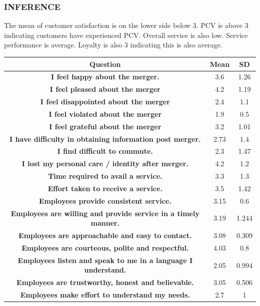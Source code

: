 \documentclass[a4paper, 12pt]{extarticle}
\begin{document}
{\subsubsection{INFERENCE}
The mean of customer satisfaction is on the lower side below 3.  PCV is above 3 indicating customers have experienced PCV. Overall service is also low. Service performance is average. Loyalty is also 3 indicating this is also average.
\begin{table}[H]
\centering
\begin{tabular}{|c|c|c|}
\hline
Question & Mean & SD \\
\hline
\textbf{ I feel happy about the merger.} & 3.6 & 1.26 \\
\hline
\textbf{ I feel pleased about the merger} & 4.2 & 1.19 \\
\hline
\textbf{ I feel disappointed about the merger } & 2.4 & 1.1 \\
\hline
\textbf{ I feel violated about the merger} & 1.9 & 0.5 \\
\hline
\textbf{ I feel grateful about the merger} & 3.2 & 1.01 \\
\hline
\textbf{ I have difficulty in obtaining information post merger. } & 2.73 & 1.4 \\
\hline
\textbf{ I find difficult to commute.} & 2.3 & 1.47 \\
\hline    
\textbf{ I lost my personal care / identity after merger. } & 4.2 & 1.2 \\
\hline
\textbf{ Time required to avail a service.} & 3.3 & 1.3 \\
\hline
\textbf{ Effort taken to receive a service.}  & 3.5 & 1.42 \\ 
\hline
\textbf{ Employees provide consistent service.}  & 3.15 & 0.6\\  
\hline
\textbf{ Employees are willing and provide service in a timely manner.} & 3.19 & 1.244\\
\hline
\textbf{ Employees are approachable and easy to contact.} & 3.08 & 0.309\\   
\hline
\textbf{ Employees are courteous, polite and respectful.} & 4.03 & 0.8 \\
\hline
\textbf{ Employees listen and speak to me in  a language I understand.} & 2.05 & 0.994 \\
\hline
\textbf{ Employees are trustworthy, honest and believable.} & 3.05 & 0.506 \\
\hline
\textbf{ Employees make effort to understand my needs.} & 2.7 & 1 \\

\end{tabular}
\end{table}}
\end{document}
